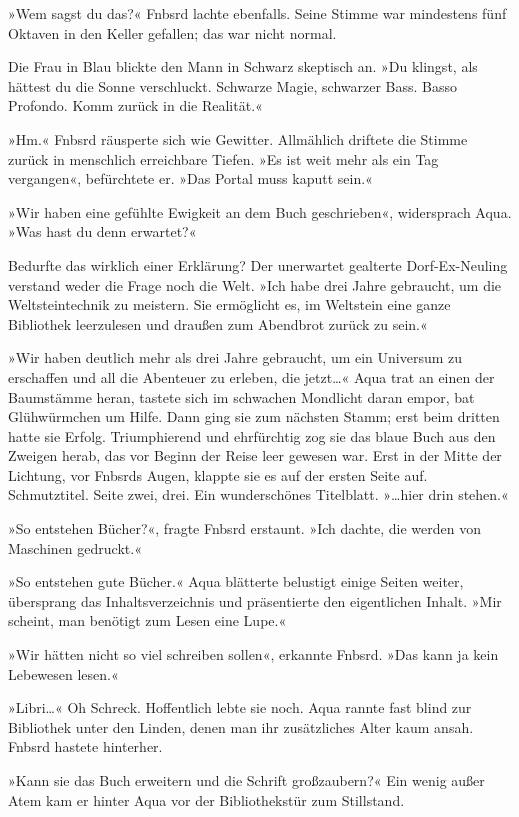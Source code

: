 »Wem sagst du das?« Fnbsrd lachte ebenfalls. Seine Stimme war mindestens fünf Oktaven in den Keller gefallen; das war nicht normal.

Die Frau in Blau blickte den Mann in Schwarz skeptisch an. »Du klingst, als hättest du die Sonne verschluckt. Schwarze Magie, schwarzer Bass. Basso Profondo. Komm zurück in die Realität.«

»Hm.« Fnbsrd räusperte sich wie Gewitter. Allmählich driftete die Stimme zurück in menschlich erreichbare Tiefen. »Es ist weit mehr als ein Tag vergangen«, befürchtete er. »Das Portal muss kaputt sein.«

»Wir haben eine gefühlte Ewigkeit an dem Buch geschrieben«, widersprach Aqua. »Was hast du denn erwartet?«

Bedurfte das wirklich einer Erklärung? Der unerwartet gealterte Dorf-Ex-Neuling verstand weder die Frage noch die Welt. »Ich habe drei Jahre gebraucht, um die Weltsteintechnik zu meistern. Sie ermöglicht es, im Weltstein eine ganze Bibliothek leerzulesen und draußen zum Abendbrot zurück zu sein.«

»Wir haben deutlich mehr als drei Jahre gebraucht, um ein Universum zu erschaffen und all die Abenteuer zu erleben, die jetzt…« Aqua trat an einen der Baumstämme heran, tastete sich im schwachen Mondlicht daran empor, bat Glühwürmchen um Hilfe. Dann ging sie zum nächsten Stamm; erst beim dritten hatte sie Erfolg. Triumphierend und ehrfürchtig zog sie das blaue Buch aus den Zweigen herab, das vor Beginn der Reise leer gewesen war. Erst in der Mitte der Lichtung, vor Fnbsrds Augen, klappte sie es auf der ersten Seite auf. Schmutztitel. Seite zwei, drei. Ein wunderschönes Titelblatt. »…hier drin stehen.«

»So entstehen Bücher?«, fragte Fnbsrd erstaunt. »Ich dachte, die werden von Maschinen gedruckt.«

»So entstehen gute Bücher.« Aqua blätterte belustigt einige Seiten weiter, übersprang das Inhaltsverzeichnis und präsentierte den eigentlichen Inhalt. »Mir scheint, man benötigt zum Lesen eine Lupe.«

»Wir hätten nicht so viel schreiben sollen«, erkannte Fnbsrd. »Das kann ja kein Lebewesen lesen.«

»Libri…« Oh Schreck. Hoffentlich lebte sie noch. Aqua rannte fast blind zur Bibliothek unter den Linden, denen man ihr zusätzliches Alter kaum ansah. Fnbsrd hastete hinterher.

»Kann sie das Buch erweitern und die Schrift großzaubern?« Ein wenig außer Atem kam er hinter Aqua vor der Bibliothekstür zum Stillstand.

